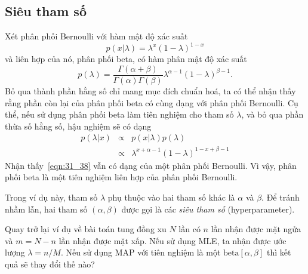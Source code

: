 \subsection{Siêu tham số}
Xét phân phối Bernoulli với hàm mật độ xác suất
\begin{equation} 
  p(x | \lambda) = \lambda^x ( 1 - \lambda)^{1 - x}
\end{equation} 
và liên hợp của nó, phân phối beta, có hàm phân mật độ xác suất
\begin{equation} 
  p(\lambda) = \frac{\Gamma(\alpha + \beta)}{\Gamma(\alpha) \Gamma(\beta)} \lambda^{\alpha - 1} ( 1 - \lambda) ^{\beta - 1}.
\end{equation} 
Bỏ qua thành phần hằng số chỉ mang mục đích chuẩn hoá, ta có thể nhận thấy rằng
phần còn lại của phân phối beta có cùng dạng với phân phối Bernoulli. Cụ thể,
nếu sử dụng phân phối beta làm tiên nghiệm cho tham số $\lambda$, và bỏ qua
phần thừa số hằng số, hậu nghiệm sẽ có dạng
\begin{eqnarray} 
\nonumber 
  p(\lambda | x) & \propto & p(x | \lambda) p(\lambda) \\\ 
  \label{eqn:31_38}
      & \propto & \lambda^{x + \alpha - 1}(1 - \lambda)^{1 - x + \beta - 1}
\end{eqnarray}  
Nhận thấy~\eqref{eqn:31_38} {vẫn có dạng của một phân phối
Bernoulli.} Vì vậy, phân phối beta là một tiên nghiệm liên hợp của phân phối Bernoulli.

Trong ví dụ này, tham số $\lambda$ phụ thuộc vào hai tham số khác là $\alpha$ và
$\beta$. Để tránh nhầm lẫn, hai tham số $(\alpha, \beta)$ được gọi là các
\textit{siêu tham số} (hyperparameter). 
 
Quay trở lại ví dụ về bài toán tung đồng xu $N$ lần có $n$ lần nhận được mặt
ngửa và $m = N - n$ lần nhận được mặt xấp. Nếu sử dụng MLE,
ta nhận được ước lượng $\lambda = n/M$. Nếu sử dụng MAP với tiên nghiệm là một
$\text{beta}[\alpha, \beta]$ thì kết quả sẽ thay đổi thế nào? 
 

